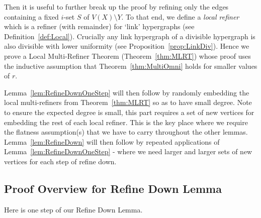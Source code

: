 \documentclass[11pt]{article}
\newcounter{i}
\theoremstyle{plain}
\theoremstyle{plain} %
\theoremstyle{definition}
\begin{document}
Then it is useful to further break up the proof by refining only the edges containing a fixed $i$-set $S$ of $V(X)\setminus Y$. To that end, we define a \emph{local refiner} which is a refiner (with remainder) for `link' hypergraphs (see Definition~\ref{def:Local}). Crucially any link hypergraph of a divisible hypergraph is also divisible with lower uniformity (see Proposition~\ref{prop:LinkDiv}). Hence we prove a Local Multi-Refiner Theorem (Theorem~\ref{thm:MLRT}) whose proof uses the inductive assumption that Theorem~\ref{thm:MultiOmni} holds for smaller values of $r$. 

Lemma~\ref{lem:RefineDownOneStep} will then follow by randomly embedding the local multi-refiners from Theorem~\ref{thm:MLRT} so as to have small degree. Note to ensure the expected degree is small, this part requires a set of new vertices for embedding the rest of each local refiner. This is the key place where we require the flatness assumption(s) that we have to carry throughout the other lemmas. Lemma~\ref{lem:RefineDown} will then follow by repeated applications of Lemma~\ref{lem:RefineDownOneStep} - where we need larger and larger sets of new vertices for each step of refine down.

\subsection{Proof Overview for Refine Down Lemma}

Here is one step of our Refine Down Lemma.
\end{document}
